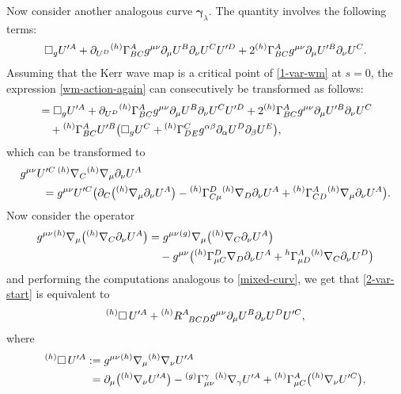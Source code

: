 \documentclass[pdftex]{sigma}
\def\ptl{\partial}%
\def\mbo#1{\boldsymbol{#1}}%
\def\grad{{\nabla}}%
\newcommand{\leftexp}[2]{{\vphantom{#2}}^{#1}{#2}}
\def \a{\alpha}
\def \b {\beta}
\renewcommand{\a}{\alpha}
\renewcommand{\b}{\beta}
\numberwithin{equation}{section}
\begin{document}
Now consider another analogous curve $\mbo{\gamma}_\lambda$. The quantity \smash{$D^2_{\mbo{\gamma}_\lambda \mbo{\gamma}_s} \cdot L_{{\rm WM}} $}
involves the following terms:
\begin{align}\label{2-var-start}
\square_g U'^{A} + \ptl_{U^D} \leftexp{(h)}{\Gamma}^A_{B C} g^{\mu \nu} \ptl_\mu U^B \ptl_\nu U^C U'^D + 2 \leftexp{(h)}{\Gamma}^A_{BC} g^{\mu \nu} \ptl_\mu U'^B \ptl_\nu U^C.
\end{align}
Assuming that the Kerr wave map is a critical point of \eqref{1-var-wm} at $s=0$, the expression \eqref{wm-action-again} can consecutively be transformed as follows:
\begin{align*}
&{}= \square_g U'^{A} + \ptl_{U^D} \leftexp{(h)}{\Gamma}^A_{B C} g^{\mu \nu} \ptl_\mu U^B \ptl_\nu U^C U'^D + 2 \leftexp{(h)}{\Gamma}^A_{BC} g^{\mu \nu} \ptl_\mu U'^B \ptl_\nu U^C \notag\\
&\quad{} + \leftexp{(h)}{\Gamma}^{A}_{BC} U'^B \bigl(\square_g U^C + \leftexp{(h)}{\Gamma}^{C}_{DE} g^{\a\b} \ptl_\a U^D \ptl_\b U^E\bigr),
\end{align*}
which can be transformed to
\begin{align*} %
&g^{\mu \nu} U'^C \, \leftexp{(h)}{\grad}_C \leftexp{(h)}{\grad}_\mu \ptl_\nu U^A \notag\\
&\qquad= g^{\mu \nu} U'^C \bigl(\ptl_C \bigl(\leftexp{(h)}{\grad}_\mu \ptl_\nu U^A\bigr) - \leftexp{(h)}{\Gamma}^D_{C \mu} \leftexp{(h)}{\grad}_D \ptl_\nu U^A + \leftexp{(h)}{\Gamma}^{A}_{CD} \leftexp{(h)}{\grad}_\mu \ptl_\nu U^A \bigr).
\end{align*}
Now consider the operator
\begin{align*} %
g^{\mu\nu}\leftexp{(h)}{\grad}_\mu \bigl(\leftexp{(h)}{\grad}_C \ptl_\nu U^A\bigr) &{}= g^{\mu \nu} \leftexp{(g)}{\grad}_\mu \bigl(\leftexp{(h)}{\grad}_C \ptl_\nu U^A\bigr) \notag\\
&\quad{} - g^{\mu \nu} \bigl(\leftexp{(h)}{\Gamma}^D_{\mu C} \grad_D \ptl_\nu U^A + \leftexp{h}{\Gamma}^A_{\mu D} \leftexp{(h)}{\grad}_C \ptl_\nu U^D \bigr)
\end{align*}
and performing the computations analogous to \eqref{mixed-curv}, we get that \eqref{2-var-start} is equivalent to
\begin{align*}
\leftexp{(h)}{\square}\, U'^A + \leftexp{(h)}{R}^A_{\,\,\,\,BCD} g^{\mu \nu} \ptl_\mu U^B \ptl_\nu U^D U'^C,
\end{align*}
where
\begin{align*}
\leftexp{(h)}{\square} \, U'^A :={}& g^{\mu \nu} \leftexp{(h)}{\grad}_\mu \leftexp{(h)}{\grad}_\nu U'^A \notag\\
 ={}& \ptl_\mu \bigl(\leftexp{(h)}{\grad}_\nu U'^A\bigr) - \leftexp{(g)}{\Gamma}^{\gamma}_{\mu \nu} \leftexp{(h)}{\grad}_\gamma U'^A + \leftexp{(h)}{\Gamma}^A_{\mu C} \bigl(\leftexp{(h)}{\grad}_\nu U'^C\bigr),
 \end{align*}
\end{document}
